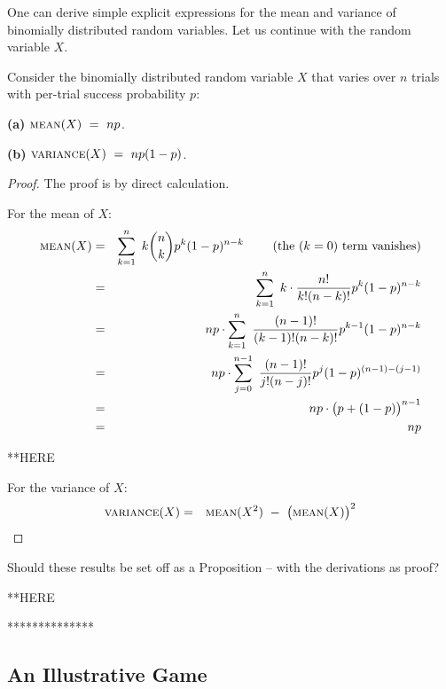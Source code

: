 \bigskip

One can derive simple explicit expressions for the mean and variance of binomially distributed random variables.  Let us continue with the random variable $X$.

\begin{prop}
\label{thm:bin-vble-mean+variance}
Consider the binomially distributed random variable $X$ that varies over $n$ trials with per-trial success probability $p$:

{\bf (a)} $\mbox{\sc mean}(X) \ = \ np$.

{\bf (b)} $\mbox{\sc variance}(X) \ = \ np(1-p)$.
\end{prop}

\begin{proof}
The proof is by direct calculation.

\smallskip

 For the mean of $X$:
\begin{eqnarray*} 
\mbox{\sc mean}(X) & = &
\sum_{k=1}^n \ k {n \choose k} p^k (1-p)^{n-k} \ \ \ \ \ \ \ \mbox{(the $(k=0)$ term vanishes)} \\
  & = &
\sum_{k=1}^n \ k \cdot \frac{n!}{k! (n-k)!} p^k (1-p)^{n-k} \\
  & = &
np \cdot \sum_{k=1}^n \ \frac{(n-1)!}{(k-1)! (n-k)!} p^{k-1} (1-p)^{n-k} \\
  & = &
np \cdot \sum_{j=0}^{n-1} \ \frac{(n-1)!}{j! (n-j)!} p^{j} (1-p)^{(n-1)-(j-1)} \\
  & = &
np \cdot \big(p + (1-p) \big)^{n-1} \\
  & = &
np
\end{eqnarray*}

**HERE

 For the variance of $X$:
\begin{eqnarray*} 
\mbox{\sc variance}(X) & = & \mbox{\sc mean}(X^2) \ - \  \big(\mbox{\sc mean}(X) \big)^2 \\
\end{eqnarray*}
\end{proof}


{\Arny Should these results be set off as a Proposition -- with the derivations as proof?} 

**HERE


**************

\subsection{An Illustrative Game}

